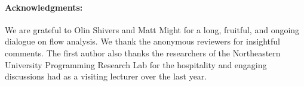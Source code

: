 \documentclass{llncs}
\begin{document}
\paragraph{Acknowledgments:}

We are grateful to Olin Shivers and Matt Might for a long, fruitful,
and ongoing dialogue on flow analysis.  We thank the anonymous
reviewers for insightful comments.  The first author also thanks the
researchers of the Northeastern University Programming Research Lab
for the hospitality and engaging discussions had as a visiting
lecturer over the last year.


\end{document}

